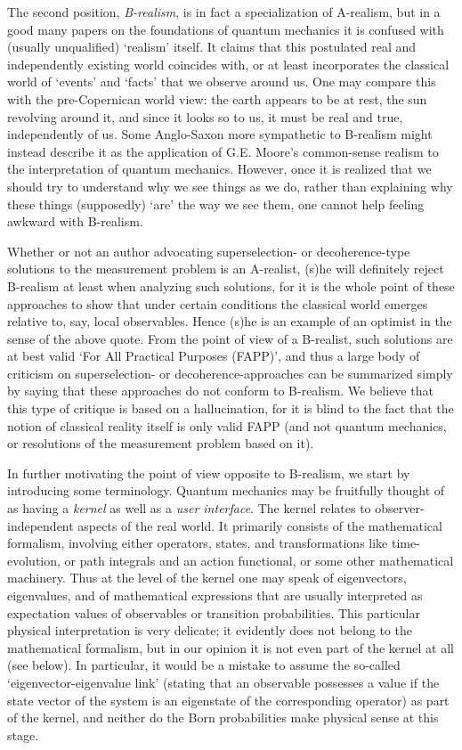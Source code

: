The second position, {\em B-realism}, is in fact a specialization of A-realism,
but in a good many
papers on the foundations of quantum mechanics it is confused with (usually
unqualified) `realism'
itself. It claims that
this postulated real and independently existing world coincides with, or at
least incorporates the
classical world of `events' and `facts' that we observe around us. One may
compare this with the
pre-Copernican world view: the earth appears to be at rest, the sun revolving
around it, and since it
looks so to us, it must be real and true, independently of us. Some Anglo-Saxon
more sympathetic to
B-realism might instead describe it as the application of G.E. Moore's
common-sense realism to the
interpretation of quantum mechanics. However, once it is realized that we
should try to understand why
we see things as we do, rather than  explaining why these things  (supposedly)
`are' the way we see
them, one cannot help feeling awkward with B-realism.

Whether or not an author advocating superselection- or decoherence-type
solutions to the measurement
problem is an A-realist, (s)he will definitely reject B-realism at least when
analyzing such
solutions, for it is the whole point of these approaches to show that under
certain conditions the
classical world emerges relative to, say, local observables. Hence (s)he is an
example of an optimist
in the sense of the above quote. From the point of view of a B-realist, such
solutions are at best
valid `For All Practical Purposes (FAPP)', and thus a large body of  criticism
on superselection- or
decoherence-approaches can be summarized simply by saying that  these
approaches do not  conform to
B-realism. We believe that this type of critique is based on a hallucination,
for
it is blind to the fact that the
notion of classical reality itself is only valid FAPP (and not quantum
mechanics, or resolutions of the measurement problem based on it).

In further motivating the  point of view opposite to B-realism, we
start by introducing some terminology.
Quantum mechanics may be fruitfully thought of as having a {\em kernel} as well
as a {\em user
interface}. The kernel relates to observer-independent aspects of the real
world. It primarily
consists of the mathematical formalism, involving either operators, states,
and transformations like time-evolution, or path integrals and an action
functional, or some other
mathematical machinery. Thus at the level of the kernel one may speak of
eigenvectors, eigenvalues,
and of mathematical expressions that are usually interpreted as   expectation
values of observables
or  transition probabilities.   This particular physical interpretation is very
delicate;
it evidently does not belong to the mathematical formalism, but
  in our opinion it is not even  part of the kernel at all (see below).
 In particular, it would be a mistake to assume the
so-called `eigenvector-eigenvalue link' (stating that an observable possesses a
value   if the
state vector of the system is an eigenstate of the corresponding operator) as
part of the kernel, and
neither do the Born probabilities make physical sense at this stage.

